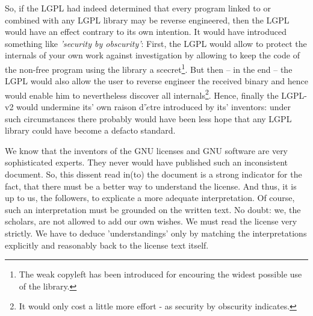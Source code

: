 So, if the LGPL had indeed determined that every program linked to or combined
with any LGPL library may be reverse engineered, then the LGPL would have an
effect contrary to its own intention. It would have introduced something like
\emph{'security by obscurity'}: First, the LGPL would allow to protect the
internals of your own work against investigation by allowing to keep the code of
the non-free program using the library a scecret\footnote{The weak copyleft has
been introduced for encouring the widest possible use of the library.}. But then
-- in the end -- the LGPL would also allow the user to reverse engineer the
received binary and hence would enable him to nevertheless discover all
internals\footnote{It would only cost a little more effort - as security by
obscurity indicates.}. Hence, finally the LGPL-v2 would undermine its' own
raison d'$\grave{e}$tre introduced by its' inventors: under such circumstances
there probably would have been less hope that any LGPL library could have become
a defacto standard.

We know that the inventors of the GNU licenses and GNU software are very
sophisticated experts. They never would have published such an inconsistent
document. So, this dissent read in(to) the document is a strong indicator for
the fact, that there must be a better way to understand the license. And thus,
it is up to us, the followers, to explicate a more adequate interpretation. Of
course, such an interpretation must be grounded on the written text. No doubt:
we, the scholars, are not allowed to add our own wishes. We must read the
license very strictly. We have to deduce 'understandings' only by matching the
interpretations explicitly and reasonably back to the license text itself.

